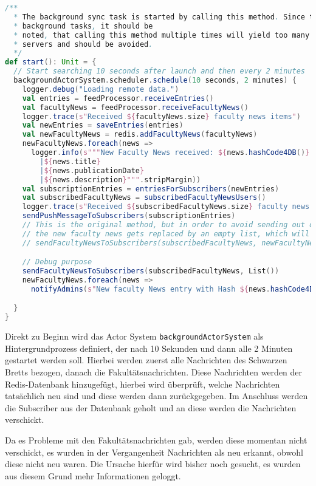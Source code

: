 \begin{lstlisting}[language=scala, style=scala, caption={Start Methode der Klasse BackgroundFeedSync}]
/**
  * The background sync task is started by calling this method. Since this starts the
  * background tasks, it should be
  * noted, that calling this method multiple times will yield too many calls to the feed's
  * servers and should be avoided.
  */
def start(): Unit = {
  // Start searching 10 seconds after launch and then every 2 minutes
  backgroundActorSystem.scheduler.schedule(10 seconds, 2 minutes) {
    logger.debug("Loading remote data.")
    val entries = feedProcessor.receiveEntries()
    val facultyNews = feedProcessor.receiveFacultyNews()
    logger.trace(s"Received ${facultyNews.size} faculty news items")
    val newEntries = saveEntries(entries)
    val newFacultyNews = redis.addFacultyNews(facultyNews)
    newFacultyNews.foreach(news =>
      logger.info(s"""New Faculty News received: ${news.hashCode4DB()}
        |${news.title}
        |${news.publicationDate}
        |${news.description}""".stripMargin))
    val subscriptionEntries = entriesForSubscribers(newEntries)
    val subscribedFacultyNews = subscribedFacultyNewsUsers()
    logger.trace(s"Received ${subscribedFacultyNews.size} faculty news subscribers")
    sendPushMessageToSubscribers(subscriptionEntries)
    // This is the original method, but in order to avoid sending out outdated faculty news,
    // the new faculty news gets replaced by an empty list, which will result in no messages sent.
    // sendFacultyNewsToSubscribers(subscribedFacultyNews, newFacultyNews)

    // Debug purpose
    sendFacultyNewsToSubscribers(subscribedFacultyNews, List())
    newFacultyNews.foreach(news =>
      notifyAdmins(s"New faculty News entry with Hash ${news.hashCode4DB()}"))

  }
}
\end{lstlisting}

Direkt zu Beginn wird das Actor System \texttt{backgroundActorSystem} als Hintergrundprozess definiert, der nach 10 Sekunden und dann alle 2 Minuten gestartet werden soll. Hierbei werden zuerst alle Nachrichten des Schwarzen Bretts bezogen, danach die Fakultätsnachrichten. Diese Nachrichten werden der Redis-Datenbank hinzugefügt, hierbei wird überprüft, welche Nachrichten tatsächlich neu sind und diese werden dann zurückgegeben. Im Anschluss werden die Subscriber aus der Datenbank geholt und an diese werden die Nachrichten verschickt.

Da es Probleme mit den Fakultätsnachrichten gab, werden diese momentan nicht verschickt, es wurden in der Vergangenheit Nachrichten als neu erkannt, obwohl diese nicht neu waren. Die Ursache hierfür wird bisher noch gesucht, es wurden aus diesem Grund mehr Informationen geloggt.

